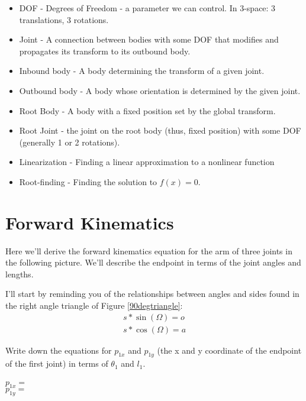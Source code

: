 \documentclass[]{article}
\begin{document}
\begin{itemize}
    \item DOF - Degrees of Freedom - a parameter we can control. In 3-space: 3 translations, 3 rotations.
    \item Joint - A connection between bodies with some DOF that modifies and propagates its transform to its outbound body.
    \item Inbound body - A body determining the transform of a given joint.
    \item Outbound body - A body whose orientation is determined by the given joint.
    \item Root Body - A body with a fixed position set by the global transform.
    \item Root Joint - the joint on the root body (thus, fixed position) with some DOF (generally 1 or 2 rotations).
    
    \item Linearization - Finding a linear approximation to a nonlinear function
    \item Root-finding - Finding the solution to $f(x) = 0$.\textbf{}
\end{itemize}

\pagebreak

\section{Forward Kinematics}\label{forwardKin}

Here we'll derive the forward kinematics equation for the arm of three joints in the following picture. We'll describe the endpoint in terms of the joint angles and lengths.
\begin{figure}[htp]
    \centering
    \hspace{3cm}
\end{figure}
I'll start by reminding you of the relationships between angles and sides found in the right angle triangle of Figure \ref{90degtriangle}:
\begin{eqnarray}
    s*\sin\left(\Omega\right) = o\\
    s*\cos\left(\Omega\right) = a
\end{eqnarray}

Write down the equations for $p_{1x}$ and $p_{1y}$ (the x and y coordinate of the endpoint of the first joint) in terms of $\theta_1$ and $l_1$.
\\
\\
    $p_{1x} = $ %
\vspace{0.5cm}
\\
    $p_{1y} = $ %
\vspace{0.5cm}
\end{document}
